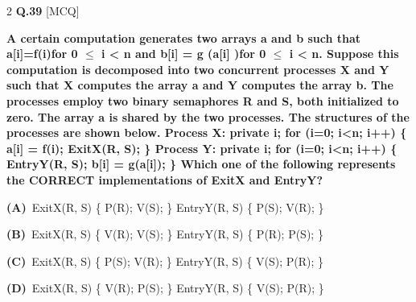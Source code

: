 \documentclass[a4paper,10pt,twoside]{article}
\begin{document}
\begin{multicols}{2}
\noindent\textbf{Q.39} \hfill {\footnotesize\textsf{[MCQ]}}
\par\vspace{2pt}
{\bfseries A certain computation generates two arrays a and b such that a[i]=f(i)for 0 $\le$ i < n and
b[i] = g (a[i] )for 0 $\le$ i < n. Suppose this computation is decomposed into two concurrent processes
X and Y such that X computes the array a and Y computes the array b. The processes employ two
binary semaphores R and S, both initialized to zero. The array a is shared by the two processes. The
structures of the processes are shown below.
Process X:
private i;
for (i=0; i<n; i++) \{
a[i] = f(i);
ExitX(R, S);
\}
Process Y:
private i;
for (i=0; i<n; i++) \{
EntryY(R, S);
b[i] = g(a[i]);
\}
Which one of the following represents the CORRECT implementations of ExitX and EntryY? \par}
\par\vspace{2pt}\noindent
\textbf{(A)}~ExitX(R, S) \{ \newline P(R); \newline V(S); \newline \} \newline EntryY(R, S) \{ \newline P(S); \newline V(R); \newline \}\par\vspace{2pt}\noindent
\textbf{(B)}~ExitX(R, S) \{ \newline V(R); \newline V(S); \newline \} \newline EntryY(R, S) \{ \newline P(R); \newline P(S); \newline \}\par\vspace{2pt}\noindent
\textbf{(C)}~ExitX(R, S) \{ \newline P(S); \newline V(R); \newline \} \newline EntryY(R, S) \{ \newline V(S); \newline P(R); \newline \}\par\vspace{2pt}\noindent
\textbf{(D)}~ExitX(R, S) \{ \newline V(R); \newline P(S); \newline \} \newline EntryY(R, S) \{ \newline V(S); \newline P(R); \newline \}

\end{multicols}
\end{document}
